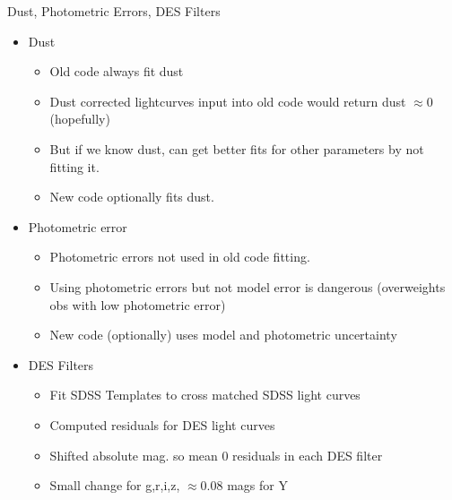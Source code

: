\documentclass[12pt]{beamer}
\begin{document}


\begin{frame}{Dust, Photometric Errors, DES Filters}
  \begin{itemize}
    \item Dust
  \begin{itemize}
  \item Old code always fit dust
  \item Dust corrected lightcurves input into old code would return dust $\approx 0$ (hopefully)
  \item But if we know dust, can get better fits for other parameters by not fitting it.
  \item New code optionally fits dust.
  \end{itemize}
\item Photometric error
  \begin{itemize}
  \item Photometric errors not used in old code fitting.
  \item Using photometric errors but not model error is dangerous (overweights obs with low photometric error)
  \item New code (optionally) uses model and photometric uncertainty
  \end{itemize}
\item DES Filters
  \begin{itemize}
  \item Fit SDSS Templates to cross matched SDSS light curves
  \item Computed residuals for DES light curves
  \item Shifted absolute mag. so mean 0 residuals in each DES filter
  \item Small change for g,r,i,z, $\approx 0.08$ mags for Y
  \end{itemize}
  \end{itemize}
  \end{frame}
\end{document}
